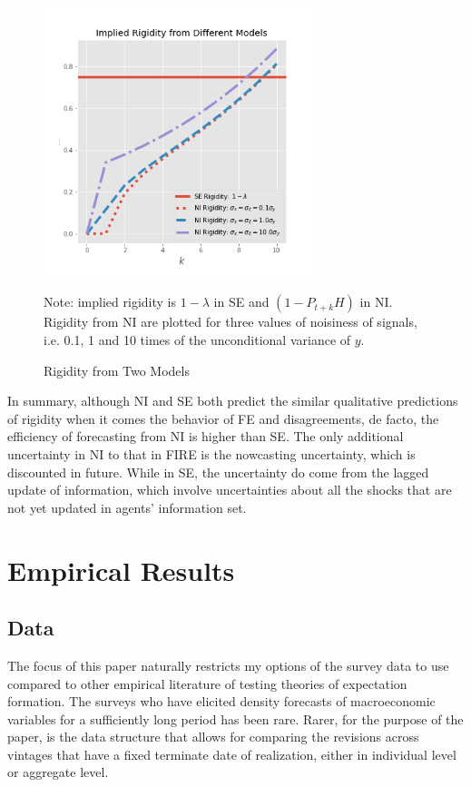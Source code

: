 \documentclass[]{article}
\begin{document}
	
	\begin{figure}[ht]
		\centering
		\includegraphics[width=0.7\textwidth]{figures/rigidity.png} 
		\begin{flushleft}
			{\footnotesize Note: implied rigidity is $1-\lambda$ in SE and $(1-P_{t+k}H)$ in NI. Rigidity from NI are plotted for three values of noisiness of signals, i.e. 0.1, 1 and 10 times of the unconditional variance of $y$. }
		\end{flushleft}
		\caption{Rigidity from Two Models}
		\label{rigidity}
	\end{figure}
	
	In summary, although NI and SE both predict the similar qualitative predictions of rigidity when it comes the behavior of FE and disagreements, de facto, the efficiency of forecasting from NI is higher than SE. The only additional uncertainty in NI to that in FIRE is the nowcasting uncertainty, which is discounted in future. While in SE, the uncertainty do come from the lagged update of information, which involve uncertainties about all the shocks that are not yet updated in agents' information set. 
	
	\section{Empirical Results}\label{empirical}
	
	\subsection{Data}
	
	The focus of this paper naturally restricts my options of the survey data to use compared to other empirical  literature of testing theories of expectation formation.  The surveys who have elicited density forecasts of macroeconomic variables for a sufficiently long period has been rare. Rarer, for the purpose of the paper, is the data structure that allows for comparing the revisions across vintages that have a fixed terminate date of realization, either in individual level or aggregate level. 
	
\end{document}
